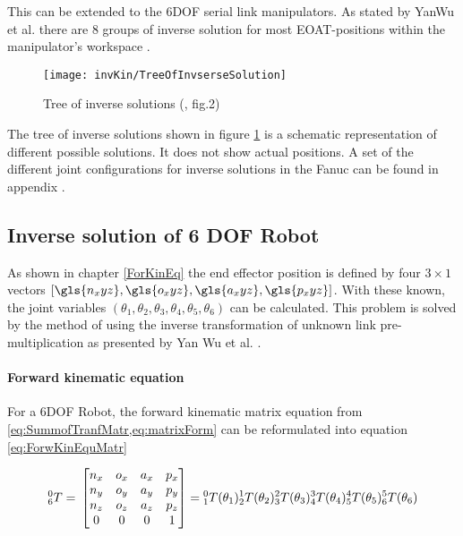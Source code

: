 This can be extended to the 6\ac{DOF} serial link manipulators.
As stated by YanWu et al. there are 8 groups of inverse solution for most \ac{EOAT}-positions within the manipulator's workspace \cite{invKinSolYanWu}. 

\begin{figure}[H]
	\texttt{[image: invKin/TreeOfInvserseSolution]}
	\caption{Tree of inverse solutions (\cite{invKinSolYanWu}, fig.2)}
	\label{fig:invKinTree}
\end{figure}
%
The tree of inverse solutions shown in figure \ref{fig:invKinTree} is a schematic representation of different possible solutions. It does not show actual positions. A set of the different joint configurations for inverse solutions in the Fanuc can be found in appendix .


\subsection{Inverse solution of 6 \ac{DOF} Robot} \label{sec:InvSol6DOF}

As shown in chapter \ref{ForKinEq} the end effector position is defined by four $3 \times 1$ vectors $[\gls{n_xyz},\gls{o_xyz},\gls{a_xyz},\gls{p_xyz}]$. With these known, the joint variables $(\theta_1, \theta_2, \theta_3, \theta_4, \theta_5, \theta_6)$ can be calculated.
This problem  is solved by the method of using the inverse transformation of unknown link pre-multiplication as presented by Yan Wu et al. \cite{invKinSolYanWu}. 

\paragraph{Forward kinematic equation}
For a  6\ac{DOF} Robot, the  forward kinematic matrix equation from \cref{eq:SummofTranfMatr,eq:matrixForm} can be reformulated into equation \ref{eq:ForwKinEquMatr}

\begin{equation}\label{eq:ForwKinEquMatr}
	^0_6T = \\
	\begin{bmatrix}
n_x & o_x & a_x & p_x \\
n_y & o_y & a_y & p_y \\
n_z & o_z & a_z & p_z \\
0 & 0 & 0 & 1 \\
\end{bmatrix}
=
\phantom{}^0_1T(\theta_1)\phantom{}^1_2T(\theta_2)\phantom{}^2_3T(\theta_3)\phantom{}^3_4T(\theta_4)\phantom{}^4_5T(\theta_5)\phantom{}^5_6T(\theta_6)\\
\end{equation}

